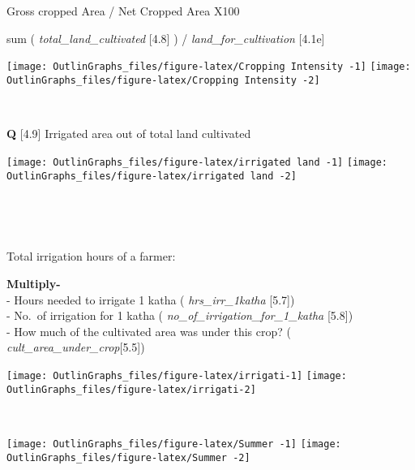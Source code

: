 \documentclass[
]{article}
\begin{document}
~

~

\noindent {}

Gross cropped Area / Net Cropped Area X100

sum ( \emph{total\_land\_cultivated} {[}4.8{]} ) /
\emph{land\_for\_cultivation} {[}4.1e{]}

\texttt{[image: OutlinGraphs\_files/figure-latex/Cropping Intensity -1]}
\texttt{[image: OutlinGraphs\_files/figure-latex/Cropping Intensity -2]}

~

\newpage

\noindent {}

\textbf{Q} {[}4.9{]} Irrigated area out of total land cultivated

\texttt{[image: OutlinGraphs\_files/figure-latex/irrigated land -1]}
\texttt{[image: OutlinGraphs\_files/figure-latex/irrigated land -2]}

~

~

Total irrigation hours of a farmer:

\textbf{Multiply-}\\
- Hours needed to irrigate 1 katha ( \emph{hrs\_irr\_1katha}
{[}5.7{]})\\
- No.~of irrigation for 1 katha (
\emph{no\_of\_irrigation\_for\_1\_katha} {[}5.8{]})\\
- How much of the cultivated area was under this crop? (
\emph{cult\_area\_under\_crop}{[}5.5{]})

\noindent {}

\texttt{[image: OutlinGraphs\_files/figure-latex/irrigati-1]}
\texttt{[image: OutlinGraphs\_files/figure-latex/irrigati-2]}

~

\newpage

\noindent
{}

\texttt{[image: OutlinGraphs\_files/figure-latex/Summer -1]}
\texttt{[image: OutlinGraphs\_files/figure-latex/Summer -2]}

~

~

\noindent
{}
\end{document}
